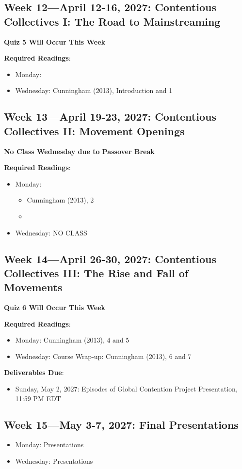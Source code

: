 \documentclass[12pt]{article}
\begin{document}
\newpage{}
\subsection*{Week 12---April 12-16, 2027: Contentious Collectives I: The Road to Mainstreaming}
\textbf{Quiz 5 Will Occur This Week}

\textbf{Required Readings}:
\begin{itemize}
    \item Monday: 
    \item Wednesday: Cunningham (2013), Introduction and 1
\end{itemize}

\subsection*{Week 13---April 19-23, 2027: Contentious Collectives II: Movement Openings}
\textbf{No Class Wednesday due to Passover Break}

\textbf{Required Readings}:
\begin{itemize}
    \item Monday: 
    \begin{itemize}
        \item Cunningham (2013), 2
        \item {}
    \end{itemize}
    \item Wednesday: NO CLASS
\end{itemize}

\newpage{}
\subsection*{Week 14---April 26-30, 2027: Contentious Collectives III: The Rise and Fall of Movements}
\textbf{Quiz 6 Will Occur This Week}

\textbf{Required Readings}:
\begin{itemize}
    \item Monday: Cunningham (2013), 4 and 5
    \item Wednesday: Course Wrap-up:  Cunningham (2013), 6 and 7
\end{itemize}

\textbf{Deliverables Due}:
\begin{itemize}
    \item Sunday, May 2, 2027: Episodes of Global Contention Project Presentation, 11:59 PM EDT
\end{itemize}

\subsection*{Week 15---May 3-7, 2027: Final Presentations}
\begin{itemize}
    \item Monday: Presentations
    \item Wednesday: Presentations
\end{itemize}
\end{document}
